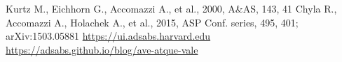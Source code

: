 \documentclass[12pt]{article}
\begin{document}
\begin{thebibliography}{42}
 Kurtz M., Eichhorn G., Accomazzi A., et al., 2000, A\&AS, 143, 41
 Chyla R., Accomazzi A., Holachek A., et al., 2015, ASP Conf. series, 495, 401; arXiv:1503.05881
 \url{https://ui.adsabs.harvard.edu}
 \url{https://adsabs.github.io/blog/ave-atque-vale}
\end{thebibliography}
\end{document}
